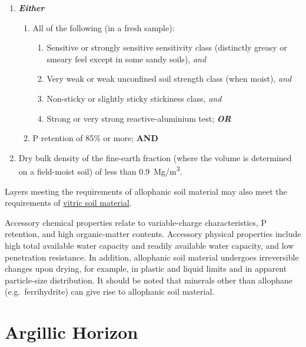 \documentclass[
  letterpaper,
  DIV=11,
  numbers=noendperiod]{scrreprt}
\providecommand{\tightlist}{%
  \setlength{\itemsep}{0pt}\setlength{\parskip}{0pt}}\usepackage{longtable,booktabs,array}
\begin{document}
\begin{enumerate}
\def\labelenumi{\arabic{enumi}.}
\tightlist
\item
  \textbf{\emph{Either}}

  \begin{enumerate}
  \def\labelenumii{(\alph{enumii})}
  \tightlist
  \item
    All of the following (in a fresh sample):

    \begin{enumerate}
    \def\labelenumiii{(\roman{enumiii})}
    \tightlist
    \item
      Sensitive or strongly sensitive sensitivity class (distinctly
      greasy or smeary feel except in some sandy soils), \emph{and}
    \item
      Very weak or weak unconfined soil strength class (when moist),
      \emph{and}
    \item
      Non-sticky or slightly sticky stickiness class, \emph{and}
    \item
      Strong or very strong reactive-aluminium test; \textbf{\emph{OR}}
    \end{enumerate}
  \item
    P retention of 85\% or more; \textbf{AND}
  \end{enumerate}
\item
  Dry bulk density of the fine-earth fraction (where the volume is
  determined on a field-moist soil) of less than
  0.9~Mg/m\textsuperscript{3}.
\end{enumerate}

Layers meeting the requirements of allophanic soil material may also
meet the requirements of \protect\hyperlink{sec-diag-vitr}{vitric soil
material}.

Accessory chemical properties relate to variable-charge characteristics,
P retention, and high organic-matter contents. Accessory physical
properties include high total available water capacity and readily
available water capacity, and low penetration resistance. In addition,
allophanic soil material undergoes irreversible changes upon drying, for
example, in plastic and liquid limits and in apparent particle-size
distribution. It should be noted that minerals other than allophane
(e.g.~ferrihydrite) can give rise to allophanic soil material.

\hypertarget{sec-diag-argh}{%
\section{Argillic Horizon}\label{sec-diag-argh}}
\end{document}
